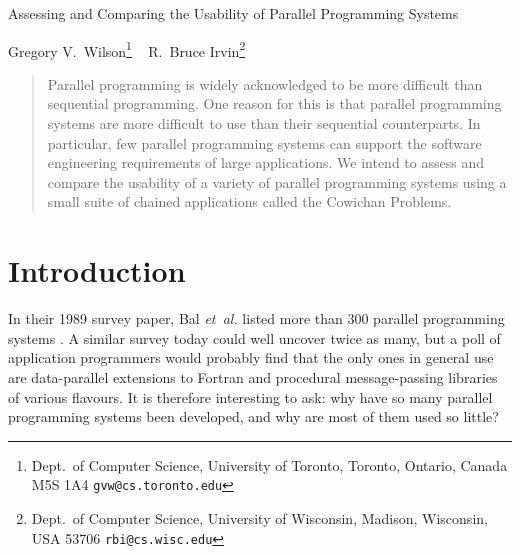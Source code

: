%
%

\newenvironment{toylist}{%
\begin{list}{\begin{math}\circ\end{math}}{\setlength{\leftmargin}{2em}\setlength{\itemsep}{0em}}}{%
\end{list}}



\begin{Large}\begin{center}
Assessing and Comparing the Usability of Parallel Programming Systems
\end{center}\end{Large}

\vspace{\baselineskip}

\begin{large}\begin{center}
Gregory V.~Wilson\footnote{Dept.\ of Computer Science,
	University of Toronto,
	Toronto, Ontario,
	Canada M5S 1A4
	\verb`gvw@cs.toronto.edu`}
~
R.~Bruce Irvin\footnote{Dept.\ of Computer Science,
	University of Wisconsin,
	Madison, Wisconsin,
	USA 53706
	\verb`rbi@cs.wisc.edu`}
\end{center}\end{large}

\vspace{\baselineskip}

\begin{abstract}
Parallel programming is widely acknowledged to be more difficult than sequential programming.
One reason for this is that parallel programming systems are more difficult to use
than their sequential counterparts.
In particular,
few parallel programming systems can support
the software engineering requirements of large applications.
We intend to assess and compare the usability of a variety of parallel programming systems
using a small suite of chained applications called the Cowichan Problems.
\end{abstract}

\section{Introduction\label{s:intro}}

In their 1989 survey paper,
Bal {\em{et~al.}\/} listed more than 300 parallel programming systems \cite{b:par-lang-survey}.
A similar survey today could well uncover twice as many,
but a poll of application programmers would probably find that
the only ones in general use are
data-parallel extensions to Fortran and procedural message-passing libraries of various flavours.
It is therefore interesting to ask:
why have so many parallel programming systems been developed,
and why are most of them used so little?

